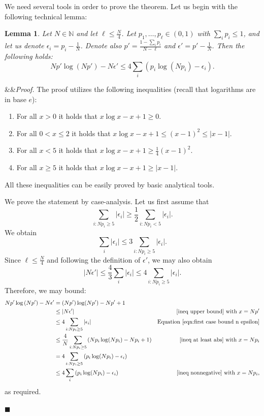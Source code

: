 \documentclass[11pt]{article}
\renewenvironment{proof}[1][]
    {\noindent
       \ifx&#1&{\it Proof.}
       \else{\it Proof ({#1}).}
       \fi}{\hfill $\blacksquare$}
\newtheorem{lemma}[theorem]{Lemma}
\newcommand{\NN}{\mathbb{N}}
\begin{document}
We need several tools in order to prove the theorem. Let us begin with the following technical lemma:
\begin{lemma}\label{lem:technical lemma}
Let $N \in \NN$ and let $\ell\le \frac{N}{4}$. Let $p_1,\dots,p_\ell \in (0,1)$ with $\sum_{i}p_{i}\le 1$, and let us denote $\epsilon_{i}=p_{i}-\frac{1}{N}$. Denote also $p'=\frac{1-\sum_{i}p_{i}}{N-\ell}$ and $\epsilon'=p'-\frac{1}{N}$. Then the following holds:
\[
    Np'\log\left(Np'\right)-N\epsilon' \le 4 \sum_{i}\left(p_{i}\log(Np_{i})-\epsilon_{i}\right).
\]
\end{lemma}
\begin{proof}
The proof utilizes the following inequalities (recall that logarithms are in base $e$):
\begin{enumerate}[label=(\roman*), ref=\text{ineq. (}\roman*\text{)}]
    \item \label{ineq nonnegative} For all $x>0$ it holds that $x\log x-x+1 \ge 0$.
    \item \label{ineq upper bound} For all $0 < x \le 2$ it holds that $x\log x-x+1\le(x-1)^{2}\le\left|x-1\right|$.
    \item \label{ineq at least square} For all $x<5$ it holds that $x\log x-x+1\ge\frac{1}{4}(x-1)^{2}$.
    \item \label{ineq at least abs} For all $x \ge 5$ it holds that $x\log x-x+1\ge\left|x-1\right|$.
\end{enumerate}

All these inequalities can be easily proved by basic analytical tools.

\medskip 

We prove the statement by case-analysis. Let us first assume that 
\[
    \sum_{i:Np_{i}\ge5}\left|\epsilon_{i}\right|\ge\frac{1}{2}\sum_{i:Np_{i}<5}\left|\epsilon_{i}\right|.
\]
We obtain 
\[
    \sum_{i}\left|\epsilon_{i}\right|\le 3 \sum_{i:Np_{i}\ge5}\left|\epsilon_{i}\right|.
\]
Since $\ell\le\frac{N}{4}$ and following the definition of $\epsilon'$, we may also obtain 
\begin{equation}\label{eqn:first case bound n epsilon}
    \left|N\epsilon'\right|\le\frac{4}{3}\sum_{i}\left|\epsilon_{i}\right| \le 4 \sum_{i:Np_{i} \ge 5} \left|\epsilon_{i}\right|.
\end{equation}
Therefore, we may bound:
\begin{align*}
    Np'\log\left(Np'\right)-N\epsilon' & =  (Np')\log(Np')-Np'+1 &\\
    & \le  \left|N\epsilon'\right| & \text{\ref{ineq upper bound} with $x=Np'$}\\
    & \le  4\sum_{i:Np_{i}\ge5}\left|\epsilon_{i}\right| & \text{Equation \eqref{eqn:first case bound n epsilon}}\\
    & \le  \frac{4}{N}\sum_{i:Np_{i}\ge5}\left(Np_{i}\log(Np_{i})-Np_{i}+1\right) & \text{\ref{ineq at least abs} with $x=Np_i$}\\
    & =  4\sum_{i:Np_{i}\ge5}\left(p_{i}\log(Np_{i})-\epsilon_{i}\right) &\\
    & \le  4\sum_{i}\left(p_{i}\log(Np_{i})-\epsilon_{i}\right) & \text{\ref{ineq nonnegative} with $x=Np_i$,}
\end{align*}
as required.


\end{proof}
\end{document}
